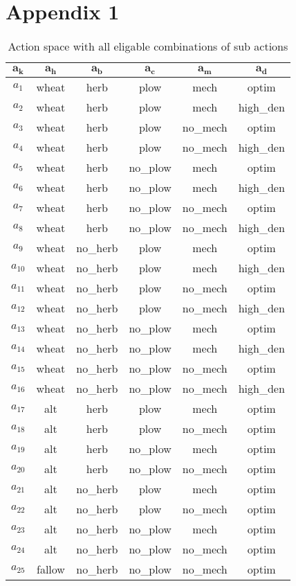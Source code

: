 \documentclass[12pt, a4paper]{article}
\begin{document}
\newpage
\section*{Appendix 1}
\begin{longtable}[h]{c c c c c c}
\caption{Action space with all eligable combinations of sub actions\label{table:action_space}}\\
	\hline
	$\mathbf{a_k}$ & $\mathbf{a_h}$ & $\mathbf{a_b}$ & $\mathbf{a_c}$ & $\mathbf{a_m}$ & $\mathbf{a_d}$\\
	\hline
	$a_1$ & wheat & herb & plow & mech & optim\\
	$a_2$ & wheat & herb & plow & mech & high\_den\\
	$a_3$ & wheat & herb & plow & no\_mech & optim\\
	$a_4$ & wheat & herb & plow & no\_mech & high\_den\\
	$a_5$ & wheat & herb & no\_plow & mech & optim\\
	$a_6$ & wheat & herb & no\_plow & mech & high\_den\\
	$a_7$ & wheat & herb & no\_plow & no\_mech & optim\\
	$a_8$ & wheat & herb & no\_plow & no\_mech & high\_den\\
	$a_9$ & wheat & no\_herb & plow & mech & optim\\
	$a_{10}$ & wheat & no\_herb & plow & mech & high\_den\\
	$a_{11}$ & wheat & no\_herb & plow & no\_mech & optim\\
	$a_{12}$ & wheat & no\_herb & plow & no\_mech & high\_den\\
	$a_{13}$ & wheat & no\_herb & no\_plow & mech & optim\\
	$a_{14}$ & wheat & no\_herb & no\_plow & mech & high\_den\\
	$a_{15}$ & wheat & no\_herb & no\_plow & no\_mech & optim\\
	$a_{16}$ & wheat & no\_herb & no\_plow & no\_mech & high\_den\\
	$a_{17}$ & alt & herb & plow & mech & optim\\
	$a_{18}$ & alt & herb & plow & no\_mech & optim\\
	$a_{19}$ & alt & herb & no\_plow & mech & optim\\
	$a_{20}$ & alt & herb & no\_plow & no\_mech & optim\\
	$a_{21}$ & alt & no\_herb & plow & mech & optim\\
	$a_{22}$ & alt & no\_herb & plow & no\_mech & optim\\
	$a_{23}$ & alt & no\_herb & no\_plow & mech & optim\\
	$a_{24}$ & alt & no\_herb & no\_plow & no\_mech & optim\\
	$a_{25}$ & fallow & no\_herb & no\_plow & no\_mech & optim\\
	\hline
\end{longtable}


 

\end{document}
